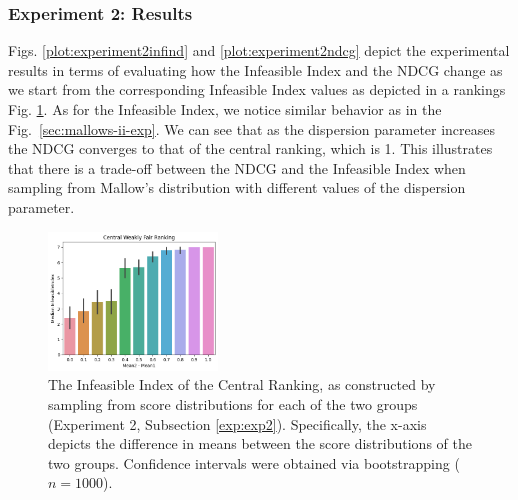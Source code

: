 \subsubsection{Experiment 2: Results} 
Figs. \ref{plot:experiment2infind} and \ref{plot:experiment2ndcg} depict the experimental results in terms of evaluating how the Infeasible Index and the NDCG change as we start from the corresponding Infeasible Index values as depicted in a rankings  Fig. \ref{plot:experiment2initialfairness}. As for the Infeasible Index, we notice similar behavior as in the Fig.~\ref{sec:mallows-ii-exp}. We can see that as the dispersion parameter increases the NDCG converges to that of the central ranking, which is 1. This illustrates that there is a trade-off between the NDCG and the Infeasible Index when sampling from Mallow's distribution with different values of the dispersion parameter.


\begin{figure}[h]
  \centering
  \includegraphics[width=0.4\textwidth]{resources/EXP2_init.png}
  \caption{The Infeasible Index of the Central Ranking, as constructed by sampling from score distributions for each of the two groups (Experiment 2, Subsection \ref{exp:exp2}). Specifically, the x-axis depicts the difference in means between the score distributions of the two groups. Confidence intervals were obtained via bootstrapping ($n=1000$).}
  \label{plot:experiment2initialfairness}
\end{figure}


